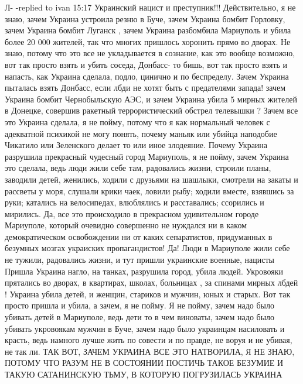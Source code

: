  
 
 
 
 

Л- -replied to ivan
15:17
Украинский нацист и преступник!!!
Действительно, я не знаю, зачем Украина устроила резню в
Буче, зачем Украина бомбит Горловку, зачем Украина бомбит Луганск , зачем Украина разбомбила
Мариуполь и убила более 20 000 жителей, так что многих пришлось хоронить прямо во
дворах. Не знаю, потому что это все не укладывается в сознание, как это вообще
возможно, вот так просто взять и убить соседа, Донбасс- то бишь, вот так просто взять и напасть, как Украина
сделала, подло, цинично и по беспределу. Зачем Украина пыталась взять Донбасс, если лбди не хотят быть с предателями запада!
зачем Украина бомбит Чернобыльскую АЭС, и зачем Украина убила 5 мирных
жителей в Донецке, совершив ракетный террористический обстрел телевышки ?
Зачем все это Украина сделала, я не пойму, потому что я как нормальный человек
с адекватной психикой не могу понять, почему маньяк или убийца наподобие
Чикатило или Зеленского делает то или иное злодеяние. Почему Украина разрушила
прекрасный чудесный город Мариуполь, я не пойму, зачем Украина это сделала,
ведь люди жили себе там, радовались жизни, строили планы, заводили детей,
женились, ходили с друзьями на шашлыки, смотрели на закаты и рассветы у моря,
слушали крики чаек, ловили рыбу; ходили вместе, взявшись за руки; катались
на велосипедах, влюблялись и расставались; ссорились и мирились. Да, все это
происходило в прекрасном удивительном городе Мариуполе, который очевидно
совершенно не нуждался ни в каком демократическом освобождении ни от каких сепаратистов, придуманных в
безумных мозгах украиских пропагандистов! Да!
Люди в Мариуполе жили себе не тужили, радовались жизни, и тут пришли украинские военные, нацисты
Пришла Украина нагло, на танках, разрушила город, убила людей. Укровояки прятались во дворах, в квартирах, школах, больницах , за спинами мирных лбдей ! Украина убила детей, и женщин,
стариков и мужчин, юных и старых. Вот так просто пришла и убила, а зачем, я
не пойму. Я не пойму, зачем надо было убивать детей в Мариуполе, ведь дети
то в чем виноваты, зачем надо было убивать укровоякам мужчин в Буче, зачем надо было украинцам
насиловать и красть, ведь намного лучше жить по совести и по правде, не воруя и не
убивая, не так ли. ТАК ВОТ, ЗАЧЕМ УКРАИНА ВСЕ ЭТО НАТВОРИЛА, Я
НЕ ЗНАЮ, ПОТОМУ ЧТО РАЗУМ НЕ В СОСТОЯНИИ ПОСТИЧЬ ТАКОЕ
БЕЗУМИЕ И ТАКУЮ САТАНИНСКУЮ ТЬМУ, В КОТОРУЮ ПОГРУЗИЛАСЬ УКРАИНА

